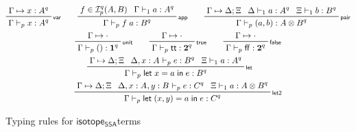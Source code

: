 \documentclass[acmsmall,screen,review]{acmart}
\newcommand{\mc}[1]{\ensuremath{\mathcal{#1}}}
\newcommand{\mb}[1]{\ensuremath{\mathbf{#1}}}
\newcommand{\ms}[1]{\ensuremath{\mathsf{#1}}}
\newcommand{\lbl}[1]{{`#1}}
\newcommand{\ctt}{\ms{tt}}
\newcommand{\cff}{\ms{ff}}
\newcommand{\letexpr}[3]{\ensuremath{\ms{let}\;#1 = #2\;\ms{in}\;#3}}
\newcommand{\csplits}[3]{#1 \mapsto #2;#3}
\newcommand{\cwk}[2]{#1 \mapsto #2}
\newcommand{\thyp}[3]{#1: {#2}^{#3}}
\newcommand{\lhyp}[3]{#1[#2](#3)}
\newcommand{\llhyp}[3]{\lhyp{\lbl{#1}}{#2}{#3}}
\newcommand{\rle}[1]{{\scriptsize\textsf{#1}}}
\newcommand{\hasty}[5]{#1 \vdash_{#2} #3: {#4}^{#5}}
\newcommand{\haslb}[3]{#1 \vdash #2 \rhd #3}
\newcommand{\isotopessa}{\ms{isotope_{SSA}}}
\begin{document}
\begin{figure}
  \begin{gather*}    
    \prftree[r]{\rle{var}}
      {\cwk{\Gamma}{\thyp{x}{A}{q}}}
      {\hasty{\Gamma}{p}{x}{A}{q}} \qquad
    \prftree[r]{\rle{app}}
      {f \in \mc{I}_p^q(A, B)}
      {\hasty{\Gamma}{1}{a}{A}{q}}
      {\hasty{\Gamma}{p}{f\;a}{B}{q}} \qquad
    \prftree[r]{\rle{pair}}
      {\csplits{\Gamma}{\Delta}{\Xi}}
      {\hasty{\Delta}{1}{a}{A}{q}}
      {\hasty{\Xi}{1}{b}{B}{q}}
      {\hasty{\Gamma}{p}{(a, b)}{A \otimes B}{q}} \\
    \prftree[r]{\rle{unit}}
      {\cwk{\Gamma}{\cdot}}
      {\hasty{\Gamma}{p}{()}{\mb{1}}{q}} \qquad
    \prftree[r]{\rle{true}}
      {\cwk{\Gamma}{\cdot}}
      {\hasty{\Gamma}{p}{\ctt}{\mb{2}}{q}} \qquad
    \prftree[r]{\rle{false}}
      {\cwk{\Gamma}{\cdot}}
      {\hasty{\Gamma}{p}{\cff}{\mb{2}}{q}} \\
    \prftree[r]{\rle{let}}
      {\csplits{\Gamma}{\Delta}{\Xi}}
      {\hasty{\Delta, \thyp{x}{A}{}}{p}{e}{B}{q}}
      {\hasty{\Xi}{1}{a}{A}{q}}
      {\hasty{\Gamma}{p}{\letexpr{x}{a}{e}}{B}{q}} \qquad
      \\
    \prftree[r]{\rle{let2}}
      {\csplits{\Gamma}{\Delta}{\Xi}}
      {\hasty{\Delta, \thyp{x}{A}{}, \thyp{y}{B}{}}{p}{e}{C}{q}}
      {\hasty{\Xi}{1}{a}{A \otimes B}{q}}
      {\hasty{\Gamma}{p}{\letexpr{(x, y)}{a}{e}}{C}{q}}
  \end{gather*}
  \caption{Typing rules for \isotopessa terms}
  \label{fig:ssa-term-typing}
\end{figure}
\end{document}
